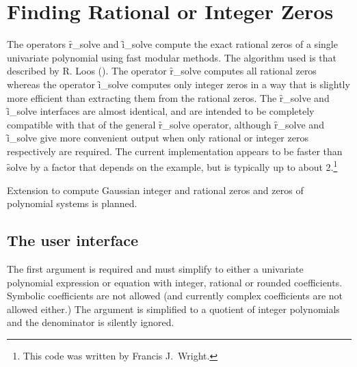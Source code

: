 \section{Finding Rational or Integer Zeros}

\iffalse
  The operators \f{r\_solve} and \f{i_\solve}  compute
  respectively the exact rational or integer zeros of a single
  univariate polynomial using fast modular methods.


  \subsection{Introduction}
  \fi
{}
\hypertarget{operator:I_SOLVE}{}
\hypertarget{operator:R_SOLVE}{}
The operators \f{r\_solve} and \f{i\_solve}  compute the exact rational zeros
of a single univariate polynomial using fast modular methods.  The
algorithm used is that described by R. Loos (\cite{Loos:1983a}).
The operator \f{r\_solve} computes
all rational zeros whereas the operator \f{i\_solve} computes only
integer zeros in a way that is slightly more efficient than extracting
them from the rational zeros.  The \f{r\_solve} and \f{i\_solve}
interfaces are almost identical, and are intended to be completely
compatible with that of the general \f{r\_solve} operator, although
\f{r\_solve} and \f{i\_solve} give more convenient output when
only rational or integer zeros respectively are required.  The current
implementation appears to be faster than \f{solve} by a factor that
depends on the example, but is typically up to about 2.\footnote{This code was written by Francis J.~Wright.}

Extension to compute Gaussian integer and rational
zeros and zeros of polynomial systems is planned.


\subsection{The user interface}

The first argument is required and must simplify to either a
univariate polynomial expression or equation with integer, rational or
rounded coefficients.  Symbolic coefficients are not allowed (and
currently complex coefficients are not allowed either.)  The argument
is simplified to a quotient of integer polynomials and the denominator
is silently ignored.

